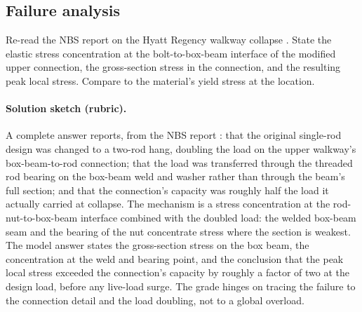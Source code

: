 \subsection*{Failure analysis}

\begin{exercise}
Re-read the NBS report on the Hyatt Regency walkway collapse
\cite{acc:nbs-hyatt-1982}. State the elastic stress concentration at
the bolt-to-box-beam interface of the modified upper connection,
the gross-section stress in the connection, and the resulting peak
local stress. Compare to the material's yield stress at the
location.
\paragraph{Solution sketch (rubric).} A complete answer reports, from
the NBS report \cite{acc:nbs-hyatt-1982}: that the original single-rod
design was changed to a two-rod hang, doubling the load on the upper
walkway's box-beam-to-rod connection; that the load was transferred
through the threaded rod bearing on the box-beam weld and washer rather
than through the beam's full section; and that the connection's capacity
was roughly half the load it actually carried at collapse. The
mechanism is a stress concentration at the rod-nut-to-box-beam
interface combined with the doubled load: the welded box-beam seam and
the bearing of the nut concentrate stress where the section is weakest.
The model answer states the gross-section stress on the box beam, the
concentration at the weld and bearing point, and the conclusion that
the peak local stress exceeded the connection's capacity by roughly a
factor of two at the design load, before any live-load surge. The grade
hinges on tracing the failure to the connection detail and the load
doubling, not to a global overload.
\end{exercise}

